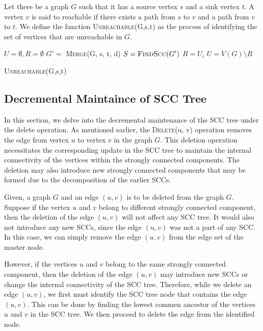 Let there be a graph $G$ such that it has a source vertex $s$ and a sink vertex $t$.
A vertex $v$ is said to reachable if there exists a path from $s$ to $v$ and a path from $v$ to $t$.
We define the function \textsc{Unreachable}(G,s,t) as the process of identifying the set of vertices that are unreachable in $G$.

\begin{algorithm}
    \SetAlgoLined
    $U = \emptyset, R = \emptyset$\;
    $G' =$ \textsc{Merge}(G, s, t, d)\;
    $S = \text{\textsc{FindScc}}(G')$\;
     {
         {
            $R = U_i$
        }
    }
    $U = V(G) \setminus R$\;
    \caption{\textsc{Unreachable}(G,s,t)}
\end{algorithm}




\subsection{Decremental Maintaince of SCC Tree}\label{Subsec: Decremental Maintaince of SCC Tree}

In this section, we delve into the decremental maintenance of the SCC tree under the delete operation.
As mentioned earlier, the \textsc{Delete}(u, v) operation removes the edge from vertex $u$ to vertex $v$ in the graph $G$.
This deletion operation necessitates the corresponding update in the SCC tree to maintain the internal connectivity of the vertices within the strongly connected components.
The deletion may also introduce new strongly connected components that may be formed due to the decomposition of the earlier SCCs.

Given, a graph $G$ and an edge $(u, v)$ is to be deleted from the graph $G$. Suppose if the vertex $u$ and $v$ belong to different strongly connected component, 
then the deletion of the edge $(u, v)$ will not affect any SCC tree. It would also not introduce any new SCCs, since the edge $(u, v)$ was not a part of any SCC.
In this case, we can simply remove the edge $(u, v)$ from the edge set of the master node.

However, if the vertices $u$ and $v$ belong to the same strongly connected component, then the deletion of the edge $(u, v)$ may introduce new SCCs or change the internal connectivity of the SCC tree.
Therefore, while we delete an edge $(u, v)$, we first must identify the SCC tree node that contains the edge $(u, v)$. This can be done by 
finding the lowest commen ancestor of the vertices $u$ and $v$ in the SCC tree. We then proceed to delete the edge from the identified node.

